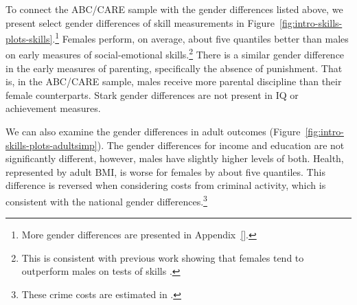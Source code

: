 To connect the ABC/CARE sample with the gender differences listed above, we present select gender differences of skill measurements in Figure~\ref{fig:intro-skills-plots-skills}.\footnote{More gender differences are presented in Appendix~\ref{}.} Females perform, on average, about five quantiles better than males on early measures of social-emotional skills.\footnote{This is consistent with previous work showing that females tend to outperform males on tests of skills \citep{Baker-Milligan_2013_Boy-Girl-Differences}.} There is a similar gender difference in the early measures of parenting, specifically the absence of punishment. That is, in the ABC/CARE sample, males receive more parental discipline than their female counterparts. Stark gender differences are not present in IQ or achievement measures. 

We can also examine the gender differences in adult outcomes (Figure~\ref{fig:intro-skills-plots-adultsimp}). The gender differences for income and education are not significantly different, however, males have slightly higher levels of both. Health, represented by adult BMI, is worse for females by about five quantiles. This difference is reversed when considering costs from criminal activity, which is consistent with the national gender differences.\footnote{These crime costs are estimated in \citet{Garcia_Heckman_Leaf_etal_2017_Comp_CBA_Unpublished}.} 

